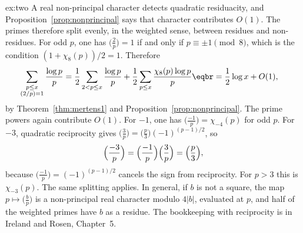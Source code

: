 \begin{solution}{ex:two}
\idea A real non-principal character detects quadratic residuacity, and Proposition~\ref{prop:nonprincipal} says that character contributes $O(1)$. The primes therefore split evenly, in the weighted sense, between residues and non-residues.
\writeup For odd $p$, one has $\bigl(\frac2p\bigr)=1$ if and only if $p\equiv\pm1\pmod8$, which is the condition $(1+\chi_8(p))/2=1$. Therefore
\[
\begin{aligned}\sum_{\substack{p\le x\\(2/p)=1}}\frac{\log p}p&=\frac12\sum_{2<p\le x}\frac{\log p}p+\frac12\sum_{p\le x}\frac{\chi_8(p)\log p}p\eqbr=\frac12\log x+O(1),\end{aligned}
\]
by Theorem~\ref{thm:mertens1} and Proposition~\ref{prop:nonprincipal}. The prime powers again contribute $O(1)$. For $-1$, one has $\bigl(\frac{-1}p\bigr)=\chi_{-4}(p)$ for odd $p$. For $-3$, quadratic reciprocity gives $\bigl(\frac3p\bigr)=\bigl(\frac p3\bigr)(-1)^{(p-1)/2}$, so
\[
\Bigl(\frac{-3}p\Bigr)=\Bigl(\frac{-1}p\Bigr)\Bigl(\frac3p\Bigr)=\Bigl(\frac p3\Bigr),
\]
because $\bigl(\frac{-1}p\bigr)=(-1)^{(p-1)/2}$ cancels the sign from reciprocity. For $p>3$ this is $\chi_{-3}(p)$. The same splitting applies. In general, if $b$ is not a square, the map $p\mapsto\bigl(\frac bp\bigr)$ is a non-principal real character modulo $4|b|$, evaluated at $p$, and half of the weighted primes have $b$ as a residue. The bookkeeping with reciprocity is in Ireland and Rosen, Chapter~5.
\end{solution}

